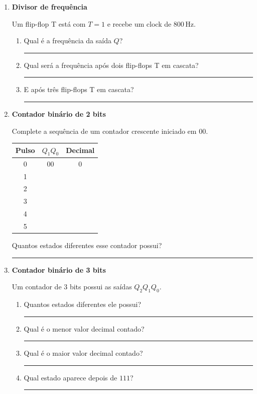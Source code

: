 \documentclass[a4paper,12pt]{article}
\begin{document}
\begin{enumerate}[leftmargin=0.8cm,label=\textbf{\arabic*.},itemsep=0.65cm]
Explique por que o flip-flop T é muito utilizado na construção de contadores.

\vspace{1cm}

\item \textbf{Divisor de frequência}

Um flip-flop T está com $T=1$ e recebe um clock de $800\,\text{Hz}$.

\begin{enumerate}[label=\alph*)]
    \item Qual é a frequência da saída $Q$? \rule{3cm}{0.4pt}
    \item Qual será a frequência após dois flip-flops T em cascata?
    \rule{3cm}{0.4pt}
    \item E após três flip-flops T em cascata? \rule{3cm}{0.4pt}
\end{enumerate}

\item \textbf{Contador binário de 2 bits}

Complete a sequência de um contador crescente iniciado em $00$.

\begin{center}
\renewcommand{\arraystretch}{1.5}
\begin{tabular}{|c|c|c|}
\hline
\textbf{Pulso} & $Q_1Q_0$ & \textbf{Decimal} \\
\hline
0 & 00 & 0 \\
\hline
1 & & \\
\hline
2 & & \\
\hline
3 & & \\
\hline
4 & & \\
\hline
5 & & \\
\hline
\end{tabular}
\end{center}

Quantos estados diferentes esse contador possui? \rule{2cm}{0.4pt}

\item \textbf{Contador binário de 3 bits}

Um contador de 3 bits possui as saídas $Q_2Q_1Q_0$.

\begin{enumerate}[label=\alph*)]
    \item Quantos estados diferentes ele possui? \rule{2cm}{0.4pt}
    \item Qual é o menor valor decimal contado? \rule{2cm}{0.4pt}
    \item Qual é o maior valor decimal contado? \rule{2cm}{0.4pt}
    \item Qual estado aparece depois de $111$? \rule{2cm}{0.4pt}
\end{enumerate}


\end{enumerate}
\end{document}
